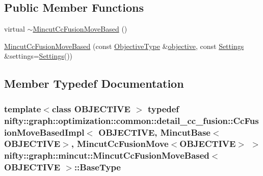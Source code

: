 \subsection*{Public Member Functions}
\begin{DoxyCompactItemize}
\item 
virtual \hyperlink{classnifty_1_1graph_1_1mincut_1_1MincutCcFusionMoveBased_a363f83daf465d39875c7bd3064668911}{$\sim$\+Mincut\+Cc\+Fusion\+Move\+Based} ()
\item 
\hyperlink{classnifty_1_1graph_1_1mincut_1_1MincutCcFusionMoveBased_af88b396d393e860efb5e318387e94a53}{Mincut\+Cc\+Fusion\+Move\+Based} (const \hyperlink{classnifty_1_1graph_1_1mincut_1_1MincutCcFusionMoveBased_accca10038e8674247dcfc5c299eba4b6}{Objective\+Type} \&\hyperlink{classnifty_1_1graph_1_1optimization_1_1common_1_1detail__cc__fusion_1_1CcFusionMoveBasedImpl_ad97005b4bf8bd030c06759e90ca8bbd3}{objective}, const \hyperlink{classnifty_1_1graph_1_1mincut_1_1MincutCcFusionMoveBased_ae4ba68d8a88d0927e8e9362fa0a68e63}{Settings} \&settings=\hyperlink{classnifty_1_1graph_1_1mincut_1_1MincutCcFusionMoveBased_ae4ba68d8a88d0927e8e9362fa0a68e63}{Settings}())
\end{DoxyCompactItemize}


\subsection{Member Typedef Documentation}
\hypertarget{classnifty_1_1graph_1_1mincut_1_1MincutCcFusionMoveBased_a59d5e184fa226773ca46fe4d3329ed52}{}
\subsubsection[{Base\+Type}]{\setlength{\rightskip}{0pt plus 5cm}template$<$class O\+B\+J\+E\+C\+T\+I\+V\+E $>$ typedef {\bf nifty\+::graph\+::optimization\+::common\+::detail\+\_\+cc\+\_\+fusion\+::\+Cc\+Fusion\+Move\+Based\+Impl}$<$ O\+B\+J\+E\+C\+T\+I\+V\+E, {\bf Mincut\+Base}$<$O\+B\+J\+E\+C\+T\+I\+V\+E$>$, {\bf Mincut\+Cc\+Fusion\+Move}$<$O\+B\+J\+E\+C\+T\+I\+V\+E$>$ $>$ {\bf nifty\+::graph\+::mincut\+::\+Mincut\+Cc\+Fusion\+Move\+Based}$<$ O\+B\+J\+E\+C\+T\+I\+V\+E $>$\+::{\bf Base\+Type}}\label{classnifty_1_1graph_1_1mincut_1_1MincutCcFusionMoveBased_a59d5e184fa226773ca46fe4d3329ed52}
\hypertarget{classnifty_1_1graph_1_1mincut_1_1MincutCcFusionMoveBased_accca10038e8674247dcfc5c299eba4b6}{}
